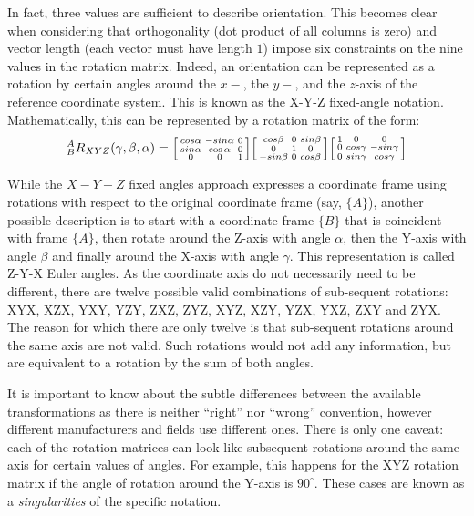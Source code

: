 In fact, three values are sufficient to describe orientation.
This becomes clear when considering that orthogonality (dot product of all columns is zero) and vector length (each vector must have length $1$) impose six constraints on the nine values in the rotation matrix.
Indeed, an orientation can be represented as a rotation by certain angles around the $x-$, the $y-$, and the $z$-axis of the reference coordinate system. This is known as the X-Y-Z fixed-angle notation. Mathematically, this can be represented by a rotation matrix of the form:
\begin{equation}
^A_BR_{XYZ}(\gamma,\beta,\alpha)=\begin{bsmallmatrix}cos\alpha & -sin\alpha & 0\\sin\alpha & \cos\alpha & 0\\0 & 0 & 1\end{bsmallmatrix}\begin{bsmallmatrix}cos\beta& 0 & sin\beta\\0 & 1 & 0\\-sin\beta & 0 & cos\beta\end{bsmallmatrix}\begin{bsmallmatrix}1 & 0 & 0 \\ 0 & cos\gamma & -sin\gamma\\0 & sin\gamma & cos\gamma\end{bsmallmatrix}
\end{equation}

While the $X-Y-Z$ fixed angles approach expresses a coordinate frame using rotations with respect to the original coordinate frame (say, $\{A\}$), another possible description is to start with a coordinate frame $\{B\}$ that is coincident with frame $\{A\}$, then rotate around the Z-axis with angle $ \alpha$, then the Y-axis with angle $ \beta$ and finally around the X-axis with angle $ \gamma$. This representation is called Z-Y-X Euler angles.
As the coordinate axis do not necessarily need to be different, there are twelve possible valid combinations of sub-sequent rotations: XYX, XZX, YXY, YZY, ZXZ, ZYZ, XYZ, XZY, YZX, YXZ, ZXY and ZYX.
The reason for which there are only twelve is that sub-sequent rotations around the same axis are not valid. Such rotations would not add any information, but are equivalent to a rotation by the sum of both angles.

It is important to know about the subtle differences between the available transformations as there is neither ``right'' nor ``wrong'' convention, however different manufacturers and fields use different ones.
There is only one caveat: each of the rotation matrices can look like subsequent rotations around the same axis for certain values of angles. For example, this happens for the XYZ rotation matrix if the angle of rotation around the Y-axis is $90^\circ$. These cases are known as a \textsl{singularities} of the specific notation.

